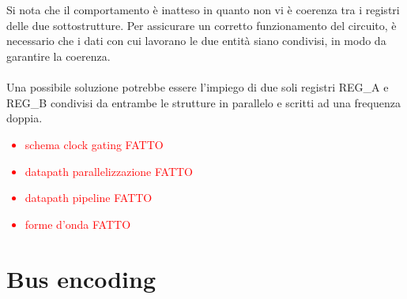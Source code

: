 \documentclass[11pt,  english, makeidx, a4paper, titlepage, oneside]{book}
\begin{document}
\\\\
Si nota che il comportamento è inatteso in quanto non vi è coerenza tra i registri delle due sottostrutture. Per assicurare un corretto funzionamento del circuito, è necessario che i dati con cui lavorano le due entità siano condivisi, in modo da garantire la coerenza.
\\\\
Una possibile soluzione potrebbe essere l'impiego di due soli registri REG\_A e REG\_B condivisi da entrambe le strutture in parallelo e scritti ad una frequenza doppia.

\textcolor{red}{
\begin{itemize}
\item schema clock gating FATTO
\item datapath parallelizzazione FATTO
\item datapath pipeline FATTO
\item forme d'onda FATTO
\end{itemize}}

\chapter{Bus encoding}
\end{document}
